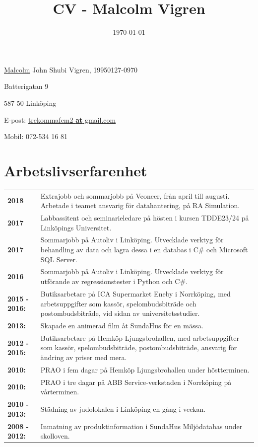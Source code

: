 \documentclass[a4paper,notitlepage]{article}
\title{
\huge{CV - Malcolm Vigren}\vspace{-3ex}}
\date{\today}
\begin{document}
	\maketitle
\underline{Malcolm} John Shubi Vigren, 19950127-0970

Batterigatan 9

587 50 Linköping

E-post: \underline{trekommafem2 \textbf{at} gmail.com}

Mobil: 072-534 16 81

\section*{Arbetslivserfarenhet}
\noindent\begin{tabular}{@{}l p{13cm}}

\textbf{2018} & Extrajobb och sommarjobb på Veoneer, från april till augusti.
    Arbetade i teamet ansvarig för datahantering, på RA Simulation. \\

\textbf{2017} & Labbassitent och seminarieledare på hösten i kursen TDDE23/24 på Linköpings
    Universitet. \\

\textbf{2017} & Sommarjobb på Autoliv i Linköping. Utvecklade verktyg 
    för behandling av data och lagra dessa i en databas i C\# och Microsoft SQL Server. \\

\textbf{2016} & Sommarjobb på Autoliv i Linköping. Utvecklade verktyg för
    utförande av regressionstester i Python och C\#.\\

\textbf{2015 - 2016:} & Butiksarbetare på ICA Supermarket Eneby i Norrköping, med
arbetsuppgifter som kassör, spelombudsbiträde och postombudsbiträde, vid sidan
av universitetsstudier. \\

\textbf{2013:} & Skapade en animerad film åt SundaHus för en mässa.
\\

\textbf{2012 - 2015:} & Butiksarbetare på Hemköp Ljungsbrohallen,
med arbetsuppgifter
som kassör,
spelombudsbiträde, postombudsbiträde, ansvarig för ändring av priser med mera.
\\

\textbf{2010:} & PRAO i fem dagar på Hemköp Ljungsbrohallen under
höstterminen. \\

\textbf{2010:} & PRAO i tre dagar på ABB Service-verkstaden i
Norrköping på vårterminen. \\

\textbf{2010 - 2013:} & Städning av judolokalen i Linköping en gång
i veckan. \\

\textbf{2008 - 2012:} & Inmatning av produktinformation i SundaHus Miljödatabas under
skolloven.	\\

	\end{tabular}
\end{document}
